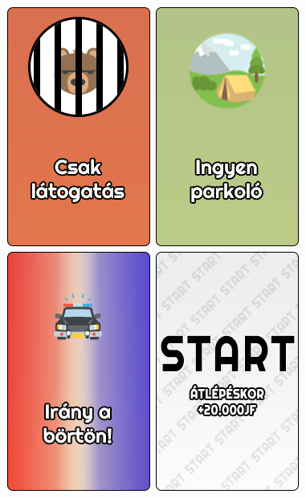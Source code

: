 \begin{figure}[h!]
\includegraphics[scale=0.4]{images/bori_latogatas.png}
\includegraphics[scale=0.4]{images/parkolo.png}
\includegraphics[scale=0.4]{images/bori.png}
\includegraphics[scale=0.4]{images/start.png}
\label{fig:ff}
\end{figure}

